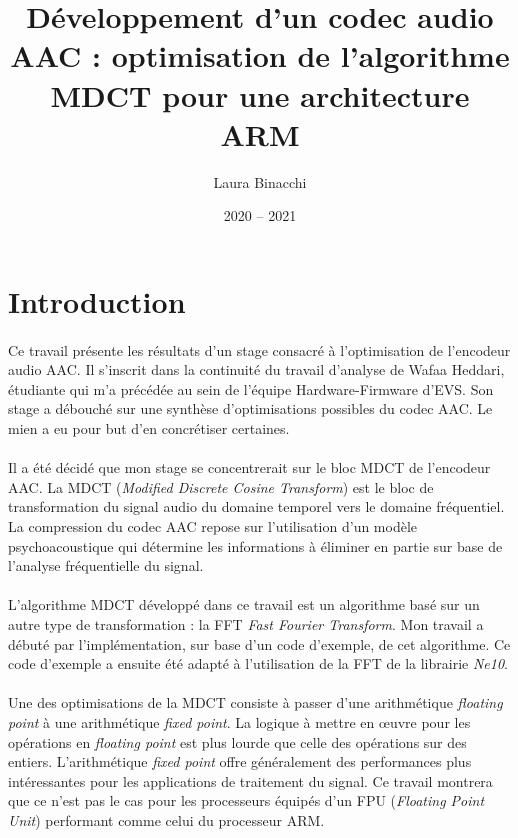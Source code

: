 \documentclass{article}
\title{Développement d'un codec audio AAC : optimisation de l'algorithme MDCT pour une architecture ARM}
\date{2020 -- 2021}
\author{Laura Binacchi}
\begin{document}
    
    \newpage
    

    \newpage
    \tableofcontents
    \newpage
    \listoffigures
    \newpage
    \printglossary[toctitle=\protect\numberline{}Glossaire]


    \newpage
    \section*{Introduction}

    \paragraph{}
    Ce travail présente les résultats d'un stage consacré à l'optimisation de l'encodeur audio AAC. Il s'inscrit dans la continuité du travail d'analyse de Wafaa Heddari, étudiante qui m'a précédée au sein de l'équipe Hardware-Firmware d'EVS. Son stage a débouché sur une synthèse d'optimisations possibles du codec AAC. Le mien a eu pour but d'en concrétiser certaines.

    \paragraph{}
    Il a été décidé que mon stage se concentrerait sur le bloc MDCT de l'encodeur AAC. La MDCT (\emph{Modified Discrete Cosine Transform}) est le bloc de transformation du signal audio du domaine temporel vers le domaine fréquentiel. La compression du codec AAC repose sur l'utilisation d'un modèle psychoacoustique qui détermine les informations à éliminer en partie sur base de l'analyse fréquentielle du signal.

    \paragraph{}
    L'algorithme MDCT développé dans ce travail est un algorithme basé sur un autre type de transformation : la FFT \emph{Fast Fourier Transform}. Mon travail a débuté par l'implémentation, sur base d'un code d'exemple, de cet algorithme. Ce code d'exemple a ensuite été adapté à l'utilisation de la FFT de la librairie \emph{Ne10}.

    \paragraph{}
    Une des optimisations de la MDCT consiste à passer d'une arithmétique \emph{floating point} à une arithmétique \emph{fixed point}. La logique à mettre en \oe uvre pour les opérations en \emph{floating point} est plus lourde que celle des opérations sur des entiers. L'arithmétique \emph{fixed point} offre généralement des performances plus intéressantes pour les applications de traitement du signal. Ce travail montrera que ce n'est pas le cas pour les processeurs équipés d'un FPU (\emph{Floating Point Unit}) performant comme celui du processeur ARM.
\end{document}
